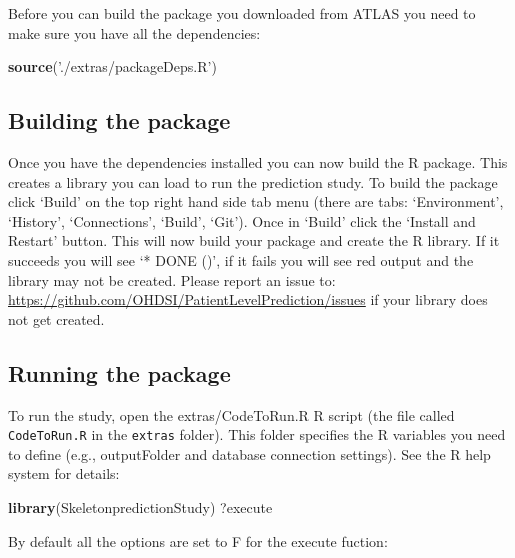 \documentclass[
]{article}
\newenvironment{Shaded}{\begin{snugshade}}{\end{snugshade}}
\newcommand{\KeywordTok}[1]{\textcolor[rgb]{0.13,0.29,0.53}{\textbf{#1}}}
\newcommand{\NormalTok}[1]{#1}
\newcommand{\StringTok}[1]{\textcolor[rgb]{0.31,0.60,0.02}{#1}}
\begin{document}
Before you can build the package you downloaded from ATLAS you need to
make sure you have all the dependencies:

\begin{Shaded}
\begin{Highlighting}[]
\KeywordTok{source}\NormalTok{(}\StringTok{'./extras/packageDeps.R'}\NormalTok{)}
\end{Highlighting}
\end{Shaded}

\hypertarget{building-the-package}{%
\subsection{Building the package}\label{building-the-package}}

Once you have the dependencies installed you can now build the R
package. This creates a library you can load to run the prediction
study. To build the package click `Build' on the top right hand side tab
menu (there are tabs: `Environment', `History', `Connections', `Build',
`Git'). Once in `Build' click the `Install and Restart' button. This
will now build your package and create the R library. If it succeeds you
will see `* DONE ()', if it fails you will see red output and the
library may not be created. Please report an issue to:
\url{https://github.com/OHDSI/PatientLevelPrediction/issues} if your
library does not get created.

\hypertarget{running-the-package}{%
\subsection{Running the package}\label{running-the-package}}

To run the study, open the extras/CodeToRun.R R script (the file called
\texttt{CodeToRun.R} in the \texttt{extras} folder). This folder
specifies the R variables you need to define (e.g., outputFolder and
database connection settings). See the R help system for details:

\begin{Shaded}
\begin{Highlighting}[]
\KeywordTok{library}\NormalTok{(SkeletonpredictionStudy)}
\NormalTok{?execute}
\end{Highlighting}
\end{Shaded}

By default all the options are set to F for the execute fuction:
\end{document}
